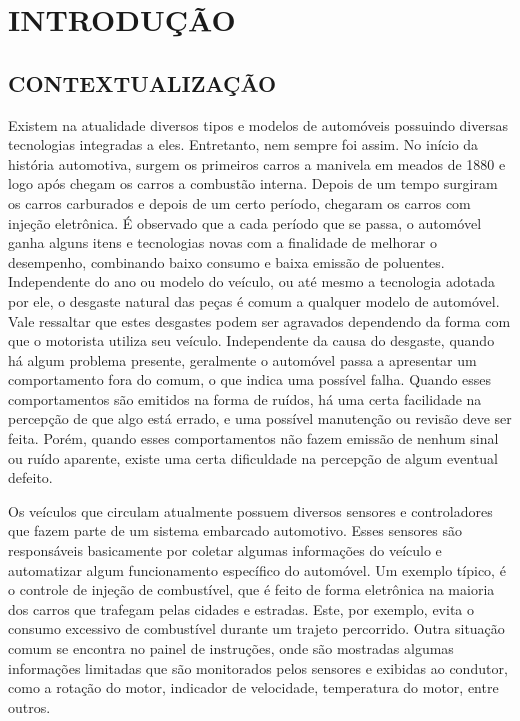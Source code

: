 \chapter{INTRODUÇÃO}\label{CAP:introducao}

\section{CONTEXTUALIZAÇÃO}
Existem na atualidade diversos tipos e modelos de automóveis possuindo diversas tecnologias integradas a eles. Entretanto, nem sempre foi assim. No início da história automotiva, surgem os primeiros carros a manivela em meados de 1880 e logo após chegam os carros a combustão interna. Depois de um tempo surgiram os carros carburados e depois de um certo período, chegaram os carros com injeção eletrônica. É observado que a cada período que se passa, o automóvel ganha alguns itens e tecnologias novas com a finalidade de melhorar o desempenho, combinando baixo consumo e baixa emissão de poluentes. Independente do ano ou modelo do veículo, ou até mesmo a tecnologia adotada por ele, o desgaste natural das peças é comum a qualquer modelo de automóvel. Vale ressaltar que estes desgastes podem ser agravados dependendo da forma com que o motorista utiliza seu veículo. Independente da causa do desgaste, quando há algum problema presente, geralmente o automóvel passa a apresentar um comportamento fora do comum, o que indica uma possível falha. Quando esses comportamentos são emitidos na forma de ruídos, há uma certa facilidade na percepção de que algo está errado, e uma possível manutenção ou revisão deve ser feita. Porém, quando esses comportamentos não fazem emissão de nenhum sinal ou ruído aparente, existe uma certa dificuldade na percepção de algum eventual defeito.

Os veículos que circulam atualmente possuem diversos sensores e controladores que fazem parte de um sistema embarcado automotivo. Esses sensores são responsáveis basicamente por coletar algumas informações do veículo e automatizar algum funcionamento específico do automóvel. Um exemplo típico, é o controle de injeção de combustível, que é feito de forma eletrônica na maioria dos carros que trafegam pelas cidades e estradas. Este, por exemplo, evita o consumo excessivo de combustível durante um trajeto percorrido. Outra situação comum se encontra no painel de instruções, onde são mostradas algumas informações limitadas que são monitorados pelos sensores e exibidas ao condutor, como a rotação do motor, indicador de velocidade, temperatura do motor, entre outros. 

